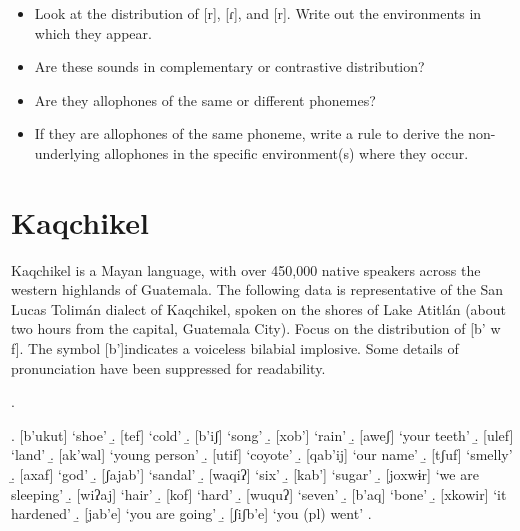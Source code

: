 \documentclass[12pt, letterpaper]{article}
\begin{document}
\begin{itemize}
    \item Look at the distribution of [r], [ɾ], and [r]. Write out the environments in which they appear.
    \vspace{1.75cm}
    \item Are these sounds in complementary or contrastive distribution?
    \vspace{1.75cm}
    \item Are they allophones of the same or different phonemes?
    \vspace{1.75cm}
    \item If they are allophones of the same phoneme, write a rule to derive the non-underlying allophones in the specific environment(s) where they occur.
\end{itemize}

\newpage

\section*{Kaqchikel} \label{sec:kaqchikel}

Kaqchikel is a Mayan language, with over 450,000 native speakers across the western highlands of Guatemala. The following data is representative of the San Lucas Tolimán dialect of Kaqchikel, spoken on the shores of Lake Atitlán (about two hours from the capital, Guatemala City). Focus on the distribution of [b’ w f]. The symbol [b’]indicates a voiceless bilabial implosive. Some details of pronunciation have been suppressed for readability.

\ex. 
\begin{multicols}{2}
    \a. {}[b’ukut] `shoe'
    \b. {}[tef] `cold'
    \b. {}[b’iʃ] `song'
    \b. {}[xob’] `rain'
    \b. {}[aweʃ] `your teeth'
    \b. {}[ulef] `land'
    \b. {}[ak'wal] `young person'
    \b. {}[utif] `coyote'
    \b. {}[qab'ij] `our name'
    \b. {}[tʃuf] `smelly'
    \b. {}[axaf] `god'
    \b. {}[ʃajab'] `sandal'
    \b. {}[waqiʔ] `six'
    \b. {}[kab'] `sugar'
    \b. {}[joxwɨr] `we are sleeping'
    \b. {}[wiʔaj] `hair'
    \b. {}[kof] `hard'
    \b. {}[wuquʔ] `seven'
    \b. {}[b'aq] `bone'
    \b. {}[xkowir] `it hardened'
    \b. {}[jab'e] `you are going'
    \b. {}[ʃiʃb'e] `you (pl) went'
    \z. 
\end{multicols}
\end{document}
